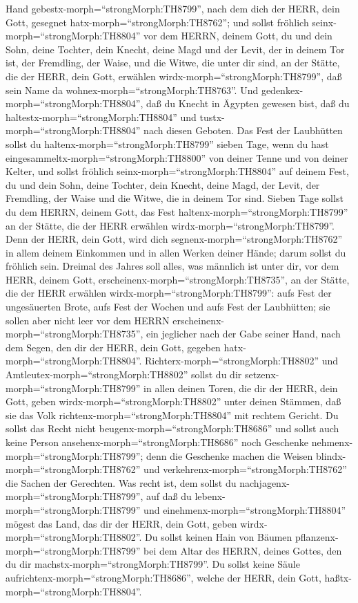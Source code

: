Hand gebestx-morph=``strongMorph:TH8799'', nach dem dich der HERR, dein
Gott, gesegnet hatx-morph=``strongMorph:TH8762'';  und
sollst fröhlich seinx-morph=``strongMorph:TH8804'' vor dem HERRN, deinem
Gott, du und dein Sohn, deine Tochter, dein Knecht, deine Magd und der
Levit, der in deinem Tor ist, der Fremdling, der Waise, und die Witwe,
die unter dir sind, an der Stätte, die der HERR, dein Gott, erwählen
wirdx-morph=``strongMorph:TH8799'', daß sein Name da
wohnex-morph=``strongMorph:TH8763''.  Und
gedenkex-morph=``strongMorph:TH8804'', daß du Knecht in Ägypten gewesen
bist, daß du haltestx-morph=``strongMorph:TH8804'' und
tustx-morph=``strongMorph:TH8804'' nach diesen Geboten. 
Das Fest der Laubhütten sollst du haltenx-morph=``strongMorph:TH8799''
sieben Tage, wenn du hast eingesammeltx-morph=``strongMorph:TH8800'' von
deiner Tenne und von deiner Kelter,  und sollst fröhlich
seinx-morph=``strongMorph:TH8804'' auf deinem Fest, du und dein Sohn,
deine Tochter, dein Knecht, deine Magd, der Levit, der Fremdling, der
Waise und die Witwe, die in deinem Tor sind.  Sieben Tage
sollst du dem HERRN, deinem Gott, das Fest
haltenx-morph=``strongMorph:TH8799'' an der Stätte, die der HERR
erwählen wirdx-morph=``strongMorph:TH8799''. Denn der HERR, dein Gott,
wird dich segnenx-morph=``strongMorph:TH8762'' in allem deinem Einkommen
und in allen Werken deiner Hände; darum sollst du fröhlich sein.
 Dreimal des Jahres soll alles, was männlich ist unter dir,
vor dem HERR, deinem Gott, erscheinenx-morph=``strongMorph:TH8735'', an
der Stätte, die der HERR erwählen wirdx-morph=``strongMorph:TH8799'':
aufs Fest der ungesäuerten Brote, aufs Fest der Wochen und aufs Fest der
Laubhütten; sie sollen aber nicht leer vor dem HERRN
erscheinenx-morph=``strongMorph:TH8735'',  ein jeglicher
nach der Gabe seiner Hand, nach dem Segen, den dir der HERR, dein Gott,
gegeben hatx-morph=``strongMorph:TH8804''. 
Richterx-morph=``strongMorph:TH8802'' und
Amtleutex-morph=``strongMorph:TH8802'' sollst du dir
setzenx-morph=``strongMorph:TH8799'' in allen deinen Toren, die dir der
HERR, dein Gott, geben wirdx-morph=``strongMorph:TH8802'' unter deinen
Stämmen, daß sie das Volk richtenx-morph=``strongMorph:TH8804'' mit
rechtem Gericht.  Du sollst das Recht nicht
beugenx-morph=``strongMorph:TH8686'' und sollst auch keine Person
ansehenx-morph=``strongMorph:TH8686'' noch Geschenke
nehmenx-morph=``strongMorph:TH8799''; denn die Geschenke machen die
Weisen blindx-morph=``strongMorph:TH8762'' und
verkehrenx-morph=``strongMorph:TH8762'' die Sachen der Gerechten.
 Was recht ist, dem sollst du
nachjagenx-morph=``strongMorph:TH8799'', auf daß du
lebenx-morph=``strongMorph:TH8799'' und
einehmenx-morph=``strongMorph:TH8804'' mögest das Land, das dir der
HERR, dein Gott, geben wirdx-morph=``strongMorph:TH8802''. 
Du sollst keinen Hain von Bäumen pflanzenx-morph=``strongMorph:TH8799''
bei dem Altar des HERRN, deines Gottes, den du dir
machstx-morph=``strongMorph:TH8799''.  Du sollst keine
Säule aufrichtenx-morph=``strongMorph:TH8686'', welche der HERR, dein
Gott, haßtx-morph=``strongMorph:TH8804''.


